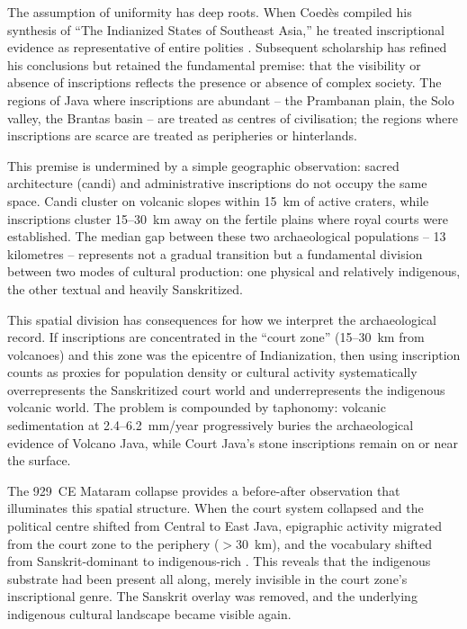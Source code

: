 \documentclass[12pt]{article}
\begin{document}
The assumption of uniformity has deep roots.
When Coed\`{e}s compiled his synthesis of ``The Indianized States of Southeast Asia,'' he treated inscriptional evidence as representative of entire polities \citep{Coedes1968}.
Subsequent scholarship has refined his conclusions but retained the fundamental premise: that the visibility or absence of inscriptions reflects the presence or absence of complex society.
The regions of Java where inscriptions are abundant -- the Prambanan plain, the Solo valley, the Brantas basin -- are treated as centres of civilisation; the regions where inscriptions are scarce are treated as peripheries or hinterlands.

This premise is undermined by a simple geographic observation: sacred architecture (candi) and administrative inscriptions do not occupy the same space.
Candi cluster on volcanic slopes within 15~km of active craters, while inscriptions cluster 15--30~km away on the fertile plains where royal courts were established.
The median gap between these two archaeological populations -- 13 kilometres -- represents not a gradual transition but a fundamental division between two modes of cultural production: one physical and relatively indigenous, the other textual and heavily Sanskritized.

This spatial division has consequences for how we interpret the archaeological record.
If inscriptions are concentrated in the ``court zone'' (15--30~km from volcanoes) and this zone was the epicentre of Indianization, then using inscription counts as proxies for population density or cultural activity systematically overrepresents the Sanskritized court world and underrepresents the indigenous volcanic world.
The problem is compounded by taphonomy: volcanic sedimentation at 2.4--6.2~mm/year progressively buries the archaeological evidence of Volcano Java, while Court Java's stone inscriptions remain on or near the surface.

The 929~CE Mataram collapse provides a before-after observation that illuminates this spatial structure.
When the court system collapsed and the political centre shifted from Central to East Java, epigraphic activity migrated from the court zone to the periphery ($>$30~km), and the vocabulary shifted from Sanskrit-dominant to indigenous-rich \citep{Christie2001}.
This reveals that the indigenous substrate had been present all along, merely invisible in the court zone's inscriptional genre.
The Sanskrit overlay was removed, and the underlying indigenous cultural landscape became visible again.
\end{document}
